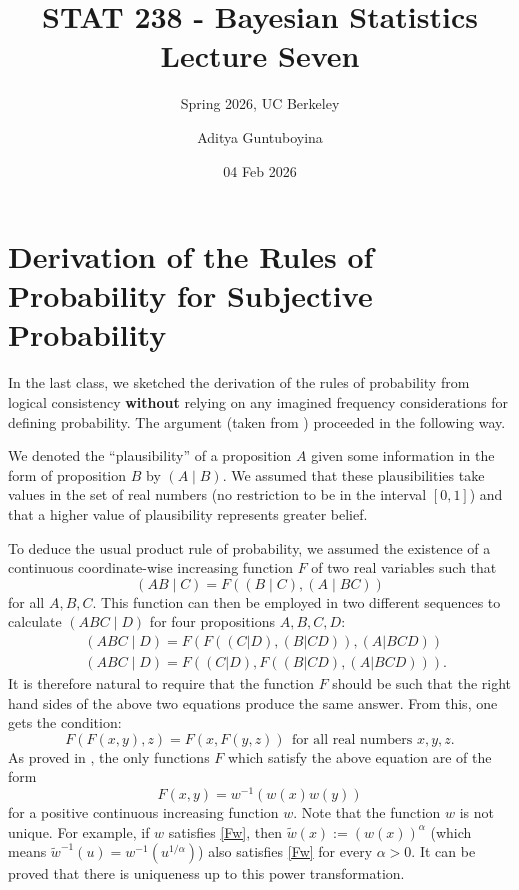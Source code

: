 \documentclass{scrartcl}
\begin{document}
\title{STAT 238 - Bayesian Statistics  \\
  Lecture Seven} 
\subtitle{Spring 2026, UC Berkeley}

\author{Aditya Guntuboyina}


\date{04 Feb 2026}

\maketitle

\section{Derivation of the Rules of Probability for Subjective
  Probability} 

In the last class, we sketched the derivation of the rules of
probability from logical consistency \textbf{without} relying on any
imagined frequency considerations for defining probability. The
argument (taken from \citet[Chapter 2]{Jaynes}) proceeded in the
following way.

We denoted the ``plausibility'' of a proposition $A$ given some
information in the form of proposition $B$ by $(A \mid B)$. We assumed
that these plausibilities take values in the set of real numbers (no
restriction to be in the interval $[0, 1]$) and that a higher value of
plausibility represents greater belief.

To deduce the usual product rule of probability, we assumed the
existence of a continuous coordinate-wise increasing function $F$ of
two real variables such that
\begin{equation*}
  (AB \mid C) = F \left((B \mid C), (A \mid BC) \right) 
\end{equation*}
for all $A, B, C$. This function can then be employed in two different
sequences to calculate $(ABC \mid D)$ for four propositions $A, B, C, D$:
\begin{align*}
&  (ABC \mid D) =   F(F((C|D), (B|CD)), (A|BCD)) \\ &
  (ABC \mid D) = F((C|D), F((B|CD), (A|BCD))). 
\end{align*}
It is therefore natural to require that the function $F$ should be such
that the right hand sides of the above two equations produce the same
answer. From this, one gets the condition:
\begin{equation*}
  F(F(x, y), z) = F(x, F(y, z)) ~~\text{for all real numbers $x, y, z$}. 
\end{equation*}
As proved in \citet[Section 2.1]{Jaynes}, the only functions $F$ which
satisfy the above equation are of the form
\begin{equation}\label{Fw}
  F(x, y) = w^{-1}(w(x) w(y))
\end{equation}
for a positive continuous increasing function $w$. Note that the
function $w$ is not unique. For example, if $w$ satisfies \eqref{Fw},
then $\tilde{w}(x) := (w(x))^{\alpha}$ (which means $\tilde{w}^{-1}(u)
= w^{-1}(u^{1/\alpha})$) also satisfies \eqref{Fw} for every $\alpha >
0$. It can be proved that there is uniqueness up to this power
transformation. 
\end{document}

